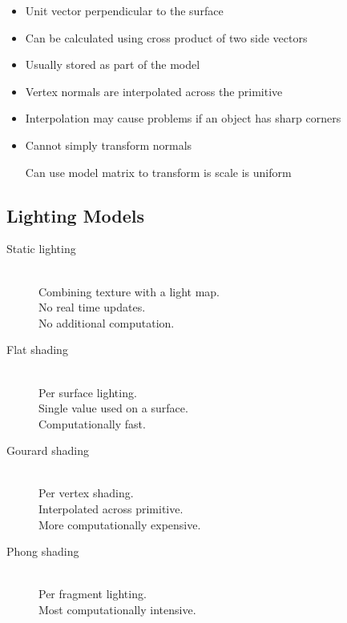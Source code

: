 \documentclass[a4paper]{article}
\begin{document}
\begin{itemize}
  \item
    Unit vector perpendicular to the surface

  \item
    Can be calculated using cross product of two side vectors

  \item
    Usually stored as part of the model

  \item
    Vertex normals are interpolated across the primitive

  \item
    Interpolation may cause problems if an object has sharp corners

  \item
    Cannot simply transform normals

    Can use model matrix to transform is scale is uniform

\end{itemize}

\subsection{Lighting Models}

\begin{description}
  \item[Static lighting] \hfill \\
    Combining texture with a light map. \\
    No real time updates. \\
    No additional computation.

  \item[Flat shading] \hfill \\
    Per surface lighting. \\
    Single value used on a surface. \\
    Computationally fast.

  \item[Gourard shading] \hfill \\
    Per vertex shading. \\
    Interpolated across primitive. \\
    More computationally expensive.

  \item[Phong shading] \hfill \\
    Per fragment lighting. \\
    Most computationally intensive.

\end{description}
\end{document}
